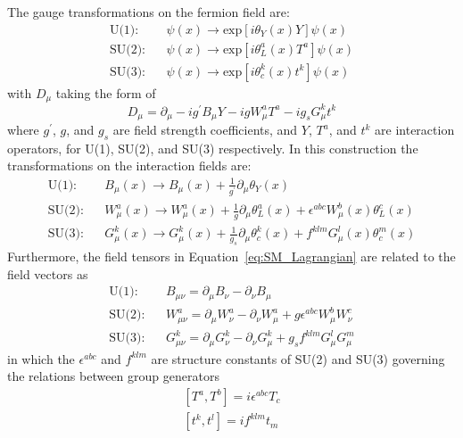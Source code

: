 The gauge transformations on the fermion field are:
\begin{equation}\label{eq:gauge_fermion}
  \begin{split}
    \text{U(1)}:  & ~~~~ \psi(x) \to  \text{exp}[i\theta_{Y}(x)Y]\psi(x) \\
    \text{SU(2)}: & ~~~~ \psi(x) \to  \text{exp}[i\theta^{a}_{L}(x)T^{a}]\psi(x) \\
    \text{SU(3)}: & ~~~~ \psi(x) \to  \text{exp}[i\theta^{k}_{c}(x)t^{k}]\psi(x) 
  \end{split}  
\end{equation}  
with $D_{\mu}$ taking the form of 
\begin{equation}\label{eq:SM_cov_dev}
  D_{\mu} = \partial_{\mu} - ig^{\prime}B_{\mu}Y - igW^{a}_{\mu}T^{a} - ig_{s}G^{k}_{\mu}t^{k}
\end{equation} 
where $g^{\prime}$, $g$, and $g_{s}$ are field strength coefficients, 
and $Y$, $T^{a}$, and $t^{k}$ are interaction operators, for U(1), SU(2), and SU(3) respectively.
In this construction the transformations on the interaction fields are:
\begin{equation}\label{eq:gauge_interaction}
  \begin{split}
    \text{U(1)}:  & ~~~~  B_{\mu}(x) \to B_{\mu}(x) + \frac{1}{g^{\prime}}\partial_{\mu}\theta_{Y}(x) \\
    \text{SU(2)}: & ~~~~  W^{a}_{\mu}(x) \to  W^{a}_{\mu}(x) + \frac{1}{g}\partial_{\mu}\theta^{a}_{L}(x) + \epsilon^{abc}W^{b}_{\mu}(x)\theta^{c}_{L}(x) \\
    \text{SU(3)}: & ~~~~  G^{k}_{\mu}(x) \to  G^{k}_{\mu}(x) + \frac{1}{g_{s}}\partial_{\mu}\theta^{k}_{c}(x) + f^{klm}G^{l}_{\mu}(x)\theta^{m}_{c}(x)
  \end{split}  
\end{equation}  
Furthermore, the field tensors in Equation~\ref{eq:SM_Lagrangian} are related to the field vectors as
\begin{equation}\label{eq:field_tensor}
  \begin{split}
    \text{U(1)}:  & ~~~~ B_{\mu\nu} = \partial_{\mu}B_{\nu} - \partial_{\nu}B_{\mu} \\
    \text{SU(2)}: & ~~~~ W^{a}_{\mu\nu} = \partial_{\mu}W^{a}_{\nu} - \partial_{\nu}W^{a}_{\mu} + g\epsilon^{abc}W^{b}_{\mu}W^{c}_{\nu} \\
    \text{SU(3)}: & ~~~~ G^{k}_{\mu\nu} = \partial_{\mu}G^{k}_{\nu} - \partial_{\nu}G^{k}_{\mu} + g_{s} f^{klm}G^{l}_{\mu}G^{m}_{\mu} 
  \end{split}
\end{equation}
in which the $\epsilon^{abc}$ and $f^{klm}$ are structure constants of SU(2) and SU(3) governing the relations between group generators
\begin{equation}\label{eq:struture_constant}
  \begin{split}
    [T^{a}, T^{b}] = i\epsilon^{abc}T_{c} \\
    [t^{k}, t^{l}] = if^{klm}t_{m}
  \end{split}
\end{equation}

